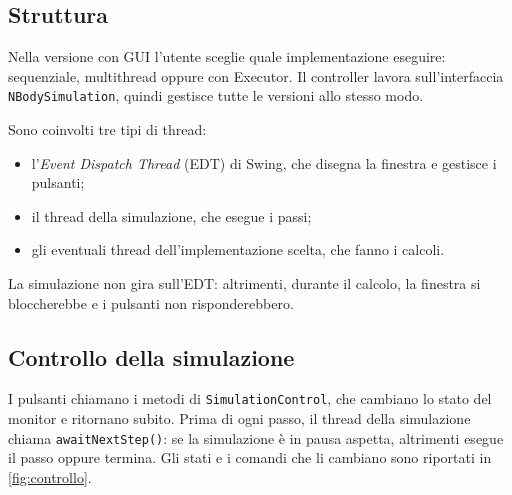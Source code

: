 \subsection{Struttura}
Nella versione con GUI l'utente sceglie quale implementazione eseguire: sequenziale, multithread oppure con Executor.
Il controller lavora sull'interfaccia \texttt{NBodySimulation}, quindi gestisce tutte le versioni allo stesso modo.

Sono coinvolti tre tipi di thread:
\begin{itemize}
  \item l'\emph{Event Dispatch Thread} (EDT) di Swing, che disegna la finestra e gestisce i pulsanti;
  \item il thread della simulazione, che esegue i passi;
  \item gli eventuali thread dell'implementazione scelta, che fanno i calcoli.
\end{itemize}
La simulazione non gira sull'EDT: altrimenti, durante il calcolo, la finestra si bloccherebbe e i pulsanti non risponderebbero.

\subsection{Controllo della simulazione}
I pulsanti chiamano i metodi di \texttt{SimulationControl}, che cambiano lo stato del monitor e ritornano subito.
Prima di ogni passo, il thread della simulazione chiama \texttt{awaitNextStep()}: se la simulazione è in pausa aspetta, altrimenti esegue il passo oppure termina.
Gli stati e i comandi che li cambiano sono riportati in \cref{fig:controllo}.

